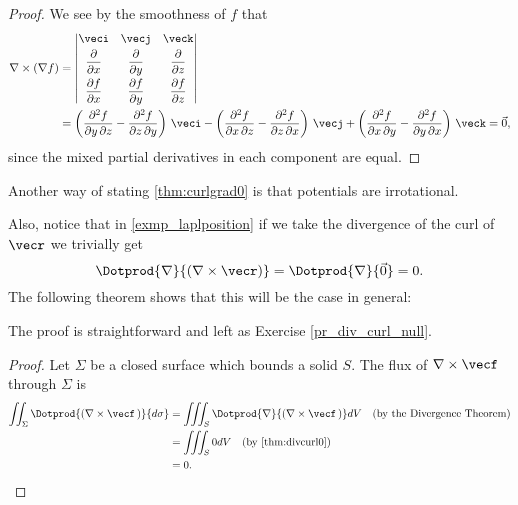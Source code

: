 
\begin{proof}
 We see by the smoothness of $f$ that
 \begin{align*}
  \nabla\times(\nabla f) &= \begin{vmatrix}
   \veci & \vecj & \veck \vspace{1mm}\\ \dfrac{\partial}{\partial x} & \dfrac{\partial}{\partial y} &
    \dfrac{\partial}{\partial z} \vspace{1mm}\\
   \dfrac{\partial f}{\partial x} & \dfrac{\partial f}{\partial y} & \dfrac{\partial f}{\partial z}
   \end{vmatrix}\\
  &= \left( \frac{\partial^2 f}{\partial y\,\partial z}-\frac{\partial^2 f}{\partial z\,\partial y} \right) \,\veci
   - \left( \frac{\partial^2 f}{\partial x\,\partial z}-\frac{\partial^2 f}{\partial z\,\partial x} \right) \,\vecj
   + \left( \frac{\partial^2 f}{\partial x\,\partial y}-\frac{\partial^2 f}{\partial y\,\partial x} \right) \,\veck
  = \vec0 ,
 \end{align*}
 since the mixed partial derivatives in each component are equal.
\end{proof}

Another way of stating \autoref{thm:curlgrad0} is that potentials are irrotational. 


Also, notice that in \autoref{exmp_laplposition} if we take the divergence of the curl of $\vecr$ we trivially get
\[
 \Dotprod{\nabla}{(\nabla\times\vecr)} = \Dotprod{\nabla}{\vec0} = 0 .
\]
The following theorem shows that this will be the case in general:


The proof is straightforward and left as Exercise \ref{pr_div_curl_null}.


\begin{proof}
 Let $\Sigma$ be a closed surface which bounds a solid $S$. The flux of $\nabla\times\vecf$ through $\Sigma$ is
 \begin{align*}
  \iint_{\Sigma} \Dotprod{(\nabla\times\vecf\,)}{d\sigma} &=
   \iiint_{S} \Dotprod{\nabla}{(\nabla\times\vecf\,)} dV\quad\text{(by the Divergence Theorem)}\\
   &= \iiint_{S} 0 dV \quad\text{(by \autoref{thm:divcurl0})}\\
   &= 0 .\qedhere
 \end{align*}
\end{proof}

